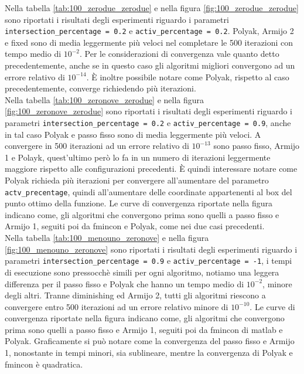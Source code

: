 \documentclass[12pt]{extarticle}
\begin{document}
Nella tabella \ref{tab:100_zerodue_zerodue} e nella figura \ref{fig:100_zerodue_zerodue} sono riportati i risultati degli esperimenti riguardo i parametri \texttt{intersection\_percentage = 0.2} e \texttt{activ\_percentage = 0.2}. Polyak, Armijo 2 e fixed sono di media leggermente più veloci nel completare le 500 iterazioni con tempo medio di $10^{-2}$. Per le considerazioni di convergenza vale quanto detto precedentemente, anche se in questo caso gli algoritmi migliori convergono ad un errore relativo di $10^{-14}$. È inoltre possibile notare come Polyak, rispetto al caso precedentemente, converge richiedendo più iterazioni.\\
Nella tabella \ref{tab:100_zeronove_zerodue}  e nella figura \ref{fig:100_zeronove_zerodue} sono riportati i risultati degli esperimenti riguardo i parametri \texttt{intersection\_percentage = 0.2} e \texttt{activ\_percentage = 0.9}, anche in tal caso Polyak e passo fisso sono di media leggermente più veloci. A convergere in 500 iterazioni ad un errore relativo di $10^{-13}$ sono passo fisso, Armijo 1 e Polayk, quest'ultimo però lo fa in un numero di iterazioni leggermente maggiore rispetto alle configurazioni precedenti. È quindi interessare notare come Polyak richieda più iterazioni per convergere all'aumentare del parametro \texttt{actv\_precentage}, quindi all'aumentare delle coordinate appartenenti al box del punto ottimo della funzione. Le curve di convergenza riportate nella figura indicano come, gli algoritmi che convergono prima sono quelli a passo fisso e Armijo 1, seguiti poi da fmincon e Polyak,  come nei due casi precedenti.\\
Nella tabella \ref{tab:100_menouno_zeronove} e nella figura \ref{fig:100_menouno_zeronove} sono riportati i risultati degli esperimenti riguardo i parametri \texttt{intersection\_percentage = 0.9} e \texttt{activ\_percentage = -1}, i tempi di esecuzione sono pressocchè simili per ogni algoritmo, notiamo una leggera differenza per il passo fisso e Polyak che hanno un tempo medio di $10^{-2}$, minore degli altri. Tranne diminishing ed Armijo 2, tutti gli algoritmi riescono a convergere entro 500 iterazioni ad un errore relativo minore di $10^{-10}$. Le curve di convergenza riportate nella figura indicano come, gli algoritmi che convergono prima sono quelli a passo fisso e Armijo 1, seguiti poi da fmincon di matlab e Polyak. Graficamente si può notare come la convergenza del passo fisso e Armijo 1, nonostante in tempi minori, sia sublineare, mentre la convergenza di Polyak e fmincon è quadratica.\\
\end{document}
